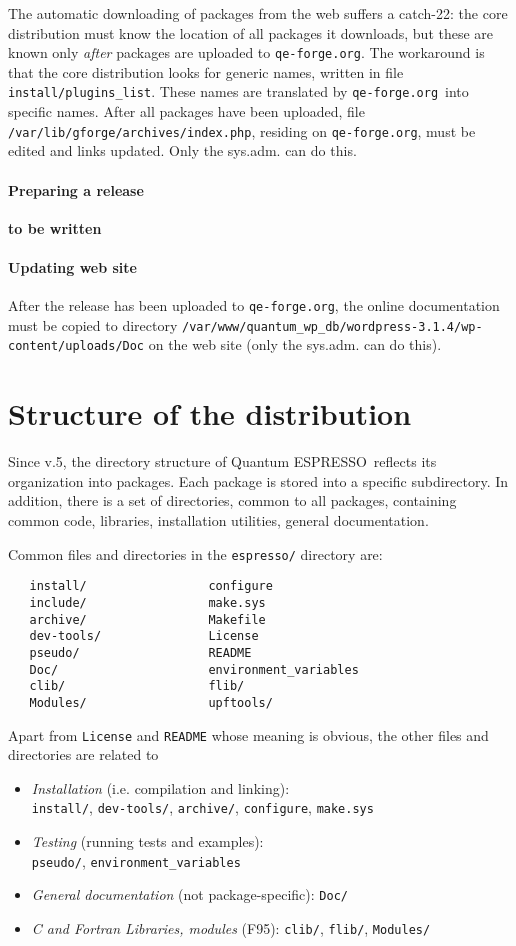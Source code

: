 \documentclass[12pt,a4paper]{article}
\def\qe{{\sc Quantum ESPRESSO}}
\def\qeforge{\texttt{qe-forge.org}}
\def\configure{\texttt{configure}}
\def\make.sys{\texttt{make.sys}}
\begin{document}
The automatic downloading of packages from the web suffers a catch-22: 
the core distribution must know the location of all packages it downloads,
but these are known only {\em after} packages are uploaded to \qeforge.
The workaround is that the core distribution looks for generic names,
written in file \texttt{install/plugins\_list}. These names are translated
by \qeforge\ into specific names. After all packages have been uploaded,
file \texttt{/var/lib/gforge/archives/index.php}, residing on \qeforge, must be
edited and links updated. Only the sys.adm. can do this.

\paragraph{Preparing a release} 
{\bf to be written} 

\paragraph{Updating web site} After the release has been uploaded to
\qeforge, the online documentation must be copied to directory
\texttt{/var/www/quantum\_wp\_db/wordpress-3.1.4/wp-content/uploads/Doc}
on the web site (only the sys.adm. can do this).

\section{Structure of the distribution}

Since v.5, the directory structure of \qe\ reflects its organization
into packages. Each package is stored into a specific subdirectory. 
In addition, there is a set of directories, common to all packages, 
containing common code, 
libraries, installation utilities, general documentation.

Common files and directories in the \texttt{espresso/} directory are:
\begin{verbatim}
   install/                 configure
   include/                 make.sys
   archive/                 Makefile
   dev-tools/               License
   pseudo/                  README
   Doc/                     environment_variables
   clib/                    flib/
   Modules/                 upftools/
\end{verbatim}
Apart from  \texttt{License} and \texttt{README} whose meaning is 
obvious, the other files and directories are related to
\begin{itemize}
\item {\em Installation} (i.e. compilation and linking):\\
\texttt{install/}, \texttt{dev-tools/}, \texttt{archive/},
\configure, \make.sys
\item  {\em Testing} (running tests and examples):\\
\texttt{pseudo/}, \texttt{environment\_variables}
\item  {\em General documentation} (not package-specific):
\texttt{Doc/}
\item {\em  C and Fortran Libraries, modules} (F95):
\texttt{clib/}, \texttt{flib/}, \texttt{Modules/}
\end{itemize}
\end{document}
